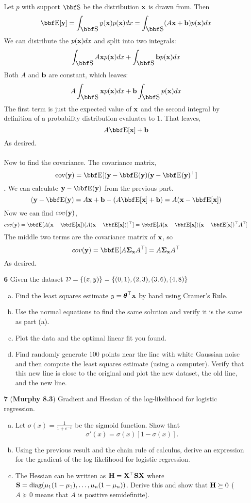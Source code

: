 \documentclass[12pt,letterpaper,fleqn]{hmcpset}
\begin{document}
\vspace{10mm}

Let $p$ with support $\SS$ be the distribution ${\bf x}$ is drawn from. Then
	$$\EE[\yy] = \int_{\SS} y(\xx) p(\xx)dx = \int_{\SS} (A\xx + \bb) p(\xx)dx$$
We can distribute the $p({\bf x})dx$ and split into two integrals:
	$$\int_{\SS} A\xx p(\xx)dx + \int_{\SS} \bb p(\xx)dx$$
Both $A$ and ${\bf b}$ are constant, which leaves:
	$$A \int_{\SS} \xx p(\xx)dx + \bb \int_{\SS}  p(\xx)dx$$
The first term is just the expected value of ${\bf x}$ and the second integral by definition of a probability distribution evaluates to 1. That leaves,
	$$A\EE[\xx] + \bb$$
As desired.\\\\

Now to find the covariance. The covariance matrix,
    $$\cov(\yy) = \EE[(\yy - \EE(\yy)(\yy - \EE(\yy)^\T]$$. 
We can calculate $\yy - \EE(\yy)$ from the previous part.
    $$(\yy - \EE(\yy) = A\xx + \bb - (A\EE[\xx] + \bb) = A(\xx - \EE[\xx])$$
Now we can find $cov({\bf y})$,
    $$cov(\yy) = \EE[A(\xx - \EE[\xx])(A(\xx - \EE[\xx]))^\T] = \EE[A(\xx - \EE[\xx])(\xx - \EE[\xx])^\T A^\T]$$
The middle two terms are the covariance matrix of ${\bf x}$, so
    $$cov(\yy) = \EE[A\Sigmab_\xx A^\T] = A\Sigmab_\xx A^\T$$
As desired.


\newpage



\textbf{6} Given the dataset ${\cal D} = \{(x,y)\} = \{(0,1), (2,3), (3,6), (4,8)\}$
\begin{enumerate}[(a)]
    \item Find the least squares estimate $y = \hbox{\boldmath$\theta$}^\top{\bf x}$ by hand using
        Cramer's Rule.
    \item Use the normal equations to find the same solution and verify it
        is the same as part (a).
    \item Plot the data and the optimal linear fit you found.
    \item Find randomly generate 100 points near the line with white Gaussian
        noise and then compute the least squares estimate (using a computer).
        Verify that this new line is close to the original and plot the new
        dataset, the old line, and the new line.
\end{enumerate}

\newpage

\textbf{7} (\textbf{Murphy 8.3}) Gradient and Hessian of the log-likelihood for
logistic regression.
\begin{enumerate}[(a)]
    \item Let $\sigma(x) = \frac{1}{1 + e^{-x}}$ be the sigmoid function. Show that
        \[
            \sigma'(x) = \sigma(x)\left[1 - \sigma(x)\right].
        \]
    \item Using the previous result and the chain rule of calculus, derive an
        expression for the gradient of the log likelihood for logistic regression.
    \item The Hessian can be written as ${\bf H}={\bf X}^\top{\bf S}{\bf X}$ where ${\bf S} =
        {\hbox{diag}}(\mu_1(1-\mu_1), \dots, \mu_n(1-\mu_n))$. Derive this and show that
        ${\bf H} \succeq 0$ ($A \succeq 0$ means that $A$ is positive semidefinite).
\end{enumerate}
\end{document}
